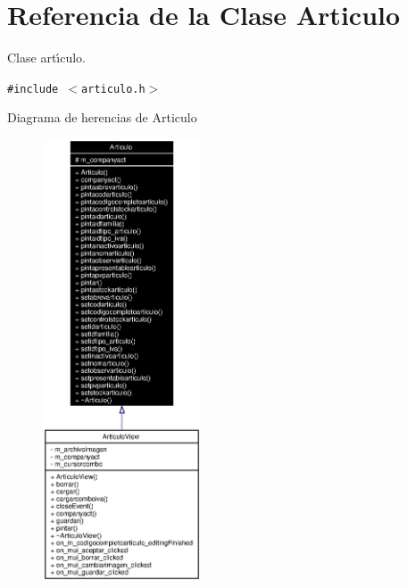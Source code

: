 \section{Referencia de la Clase Articulo}
\label{classArticulo}
Clase art\'{\i}culo.  


{\tt \#include $<$articulo.h$>$}

Diagrama de herencias de Articulo\begin{figure}[H]
\begin{center}
\leavevmode
\includegraphics[width=133pt]{classArticulo__inherit__graph}
\end{center}
\end{figure}
